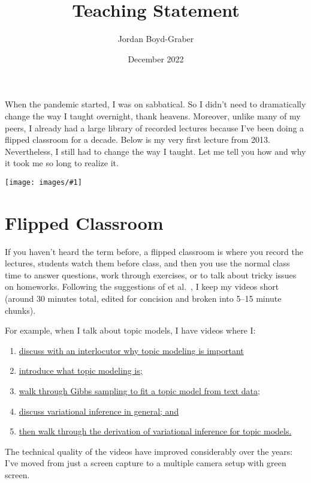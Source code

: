 \documentclass[11pt]{amsart}
\newcommand{\image}[2]{  \begin{center}
\texttt{[image: images/\#1]}
\end{center}
  }
\newcommand{\newcite}[2]{\capitalisewords{#1} et al.~\cite{#1-#2}}
\begin{document}
 \title{Teaching Statement}

 \author{Jordan Boyd-Graber}
\address{University of Maryland}

\date{December 2022}

\maketitle

When the pandemic started, I was on sabbatical.  So I didn't need to
dramatically change the way I taught overnight, thank heavens.
%
Moreover, unlike many of my peers, I
already had a large library of recorded lectures because I've been
doing a flipped classroom for a decade.  Below is my very first lecture
from 2013.
%
Nevertheless, I still had to change the way I taught.
%
Let me tell you how and why it took me so long to realize it.

\image{first_video_lecture}{}

\section{Flipped Classroom}

If you haven't heard the term before, a flipped classroom is where you
record the lectures, students watch them before class, and then you
use the normal class time to answer questions, work through exercises,
or to talk about tricky issues on homeworks.
%
Following the
suggestions of \newcite{Zappe}{09}, I keep my videos short (around 30
minutes total, edited for concision and broken into 5--15 minute
chunks).

For example, when I talk about topic models, I have videos where I:
  \begin{enumerate}
  \item \href{https://youtu.be/qvr5J9m7Gmw}{discuss with an interlocutor why
    topic modeling is important}
  \item \href{https://www.youtube.com/watch?v=fCmIceNqVog}{introduce what
    topic modeling is;}
  \item \href{https://youtu.be/-tKmyHoVZ-g}{walk through Gibbs sampling to fit
  a topic model from text data;}
  \item \href{https://youtu.be/-tKmyHoVZ-g}{discuss variational inference in
    general; and}
  \item \href{https://youtu.be/smfWKhDcaoA}{then walk through the derivation
    of variational inference for topic models.}
  \end{enumerate}
%
The technical quality of the videos have
improved considerably over the years: I've moved from just a screen
capture to a multiple camera setup with green screen.
\end{document}
